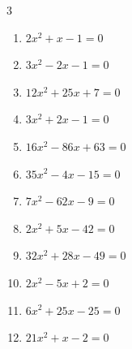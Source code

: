 \begin{multicols}{3}
\begin{enumerate}

  \item $2x^{2}+x-1=0$


  \item $3x^{2}-2x-1=0$


  \item $12x^{2}+25x+7=0$


  \item $3x^{2}+2x-1=0$


\columnbreak %

  \item $16x^{2}-86x+63=0$


  \item $35x^{2}-4x-15=0$


  \item $7x^{2}-62x-9=0$


  \item $2x^{2}+5x-42=0$


  \item $32x^{2}+28x-49=0$


  \item $2x^{2}-5x+2=0$


  \item $6x^{2}+25x-25=0$


  \item $21x^{2}+x-2=0$



\end{enumerate}
\end{multicols}
